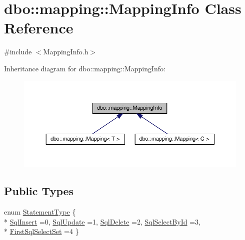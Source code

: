 \hypertarget{classdbo_1_1mapping_1_1_mapping_info}{\section{dbo\+:\+:mapping\+:\+:Mapping\+Info Class Reference}
\label{classdbo_1_1mapping_1_1_mapping_info}
}


{\ttfamily \#include $<$Mapping\+Info.\+h$>$}



Inheritance diagram for dbo\+:\+:mapping\+:\+:Mapping\+Info\+:\nopagebreak
\begin{figure}[H]
\begin{center}
\leavevmode
\includegraphics[width=350pt]{classdbo_1_1mapping_1_1_mapping_info__inherit__graph}
\end{center}
\end{figure}
\subsection*{Public Types}
\begin{DoxyCompactItemize}
\item 
enum \hyperlink{classdbo_1_1mapping_1_1_mapping_info_a8edaff7685bc58254cd05ef19ad19c09}{Statement\+Type} \{ \\*
\hyperlink{classdbo_1_1mapping_1_1_mapping_info_a8edaff7685bc58254cd05ef19ad19c09a5f8fdefc757a0babb57069a4190d9ba0}{Sql\+Insert} =0, 
\hyperlink{classdbo_1_1mapping_1_1_mapping_info_a8edaff7685bc58254cd05ef19ad19c09ab1421ced8701f4023a7d3409a5d7e04f}{Sql\+Update} =1, 
\hyperlink{classdbo_1_1mapping_1_1_mapping_info_a8edaff7685bc58254cd05ef19ad19c09a5600f10d886e3eb9c4b8bc2f6becff6d}{Sql\+Delete} =2, 
\hyperlink{classdbo_1_1mapping_1_1_mapping_info_a8edaff7685bc58254cd05ef19ad19c09a2f33d6bb8c5068aab32a5050b5166507}{Sql\+Select\+By\+Id} =3, 
\\*
\hyperlink{classdbo_1_1mapping_1_1_mapping_info_a8edaff7685bc58254cd05ef19ad19c09a9a17045c8f9fecfc4ae978657aa46aca}{First\+Sql\+Select\+Set} =4
 \}
\end{DoxyCompactItemize}
